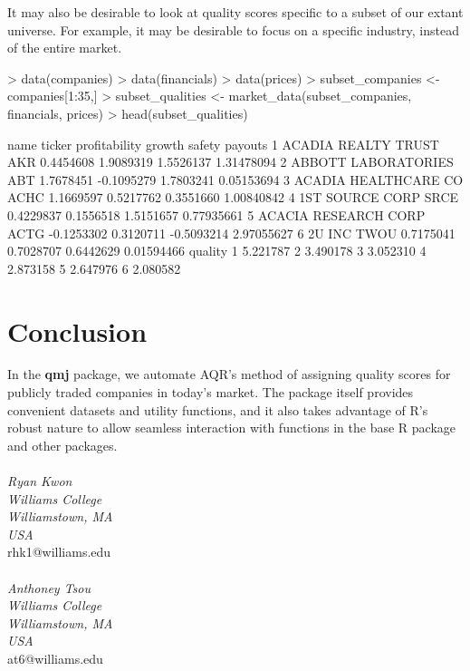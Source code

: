 \documentclass[titlepage]{article}
\begin{document}
It may also be desirable to look at quality scores specific to a subset of our extant universe. For example, it may be desirable to focus on a specific industry, instead of the entire market.

\begin{Schunk}
\begin{Sinput}
> data(companies)
> data(financials)
> data(prices)
> subset_companies <- companies[1:35,]
> subset_qualities <- market_data(subset_companies, financials, prices)
> head(subset_qualities)
\end{Sinput}
\begin{Soutput}
                  name ticker profitability     growth     safety    payouts
1  ACADIA REALTY TRUST    AKR     0.4454608  1.9089319  1.5526137 1.31478094
2  ABBOTT LABORATORIES    ABT     1.7678451 -0.1095279  1.7803241 0.05153694
3 ACADIA HEALTHCARE CO   ACHC     1.1669597  0.5217762  0.3551660 1.00840842
4      1ST SOURCE CORP   SRCE     0.4229837  0.1556518  1.5151657 0.77935661
5 ACACIA RESEARCH CORP   ACTG    -0.1253302  0.3120711 -0.5093214 2.97055627
6               2U INC   TWOU     0.7175041  0.7028707  0.6442629 0.01594466
   quality
1 5.221787
2 3.490178
3 3.052310
4 2.873158
5 2.647976
6 2.080582
\end{Soutput}
\end{Schunk}

\section*{Conclusion}

In the \textbf{qmj} package, we automate AQR's method of assigning quality scores for publicly traded companies in today's market. The package itself provides convenient datasets and utility functions, and it also takes advantage of R's robust nature to allow seamless interaction with functions in the base R package and other packages.
\\
\\
\emph{Ryan Kwon}
\\
\emph{Williams College}
\\
\emph{Williamstown, MA}
\\
\emph{USA}
\\
rhk1@williams.edu
\\
\\
\emph{Anthoney Tsou}
\\
\emph{Williams College}
\\
\emph{Williamstown, MA}
\\
\emph{USA}
\\
at6@williams.edu
\end{document}
